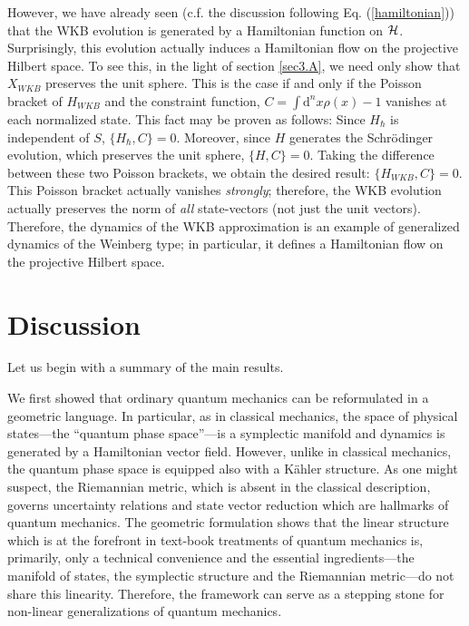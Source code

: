 \documentclass[12pt,aps,eqsecnum,tighten]{revtex4-2}
\def\d{{\mathrm d}}
\def\H{{\cal H}}
\begin{document}
However, we have already seen (c.f. the discussion following
Eq. (\ref{hamiltonian})) that the WKB evolution is generated by a
Hamiltonian function on $\H$. Surprisingly, this evolution actually
induces a Hamiltonian flow on the projective Hilbert space.  To see
this, in the light of section \ref{sec3.A}, we need only show that
$X_{WKB}$ preserves the unit sphere.  This is the case if and only if
the Poisson bracket of $H_{WKB}$ and the constraint function, $C =
\int \d^n \!x \rho(x) -1$ vanishes at each normalized state. This fact
may be proven as follows: Since $H_{\hbar}$ is independent of $S$,
$\{H_\hbar, C \} = 0$.  Moreover, since $H$ generates the
Schr\"odinger evolution, which preserves the unit sphere, $\{H,
C\}=0$.  Taking the difference between these two Poisson brackets, we
obtain the desired result: $\{H_{WKB}, C\} = 0$.  This Poisson bracket
actually vanishes {\em strongly}; therefore, the WKB evolution
actually preserves the norm of {\em all} state-vectors (not just the
unit vectors).  Therefore, the dynamics of the WKB approximation is an
example of generalized dynamics of the Weinberg type; in particular,
it defines a Hamiltonian flow on the projective Hilbert space.


\section{Discussion}

Let us begin with a summary of the main results. 

We first showed that ordinary quantum mechanics can be reformulated in
a geometric language.  In particular, as in classical mechanics, the
space of physical states---the ``quantum phase space''---is a
symplectic manifold and dynamics is generated by a Hamiltonian vector
field. However, unlike in classical mechanics, the quantum phase space
is equipped also with a K\"ahler structure. As one might suspect, the
Riemannian metric, which is absent in the classical description,
governs uncertainty relations and state vector reduction which are
hallmarks of quantum mechanics. The geometric formulation shows that
the linear structure which is at the forefront in text-book treatments
of quantum mechanics is, primarily, only a technical convenience and
the essential ingredients---the manifold of states, the symplectic
structure and the Riemannian metric---do not share this
linearity. Therefore, the framework can serve as a stepping stone
for non-linear generalizations of quantum mechanics.
\end{document}
